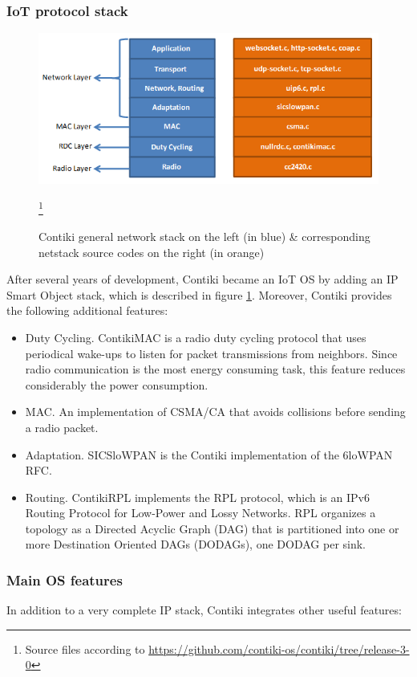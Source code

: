 \subsubsection{IoT protocol stack}
\begin{figure}[htb]
	\centering
	\includegraphics[width=1\columnwidth]{chapters/background.images/Contikinetstack.png}
	\caption{Contiki general network stack on the left (in blue) \& corresponding  netstack source codes on the right (in orange)}\footnote{Source files according to \url{https://github.com/contiki-os/contiki/tree/release-3-0}}
	\label{fig:ContikiNetStack}
\end{figure}
After several years of development, Contiki became an IoT OS by adding an IP Smart Object stack, which is described in figure \ref{fig:ContikiNetStack}.
Moreover, Contiki provides the following additional features:
\begin{itemize}
	\item Duty Cycling. ContikiMAC\cite{dunkels2011contikimac} is a radio duty cycling protocol that uses periodical wake-ups to listen for packet transmissions from neighbors.
	Since radio communication is the most energy consuming task, this feature reduces considerably the power consumption.
	\item MAC. An implementation of CSMA/CA that avoids collisions before sending a radio packet.
	\item Adaptation. SICSloWPAN is the Contiki implementation of the 6loWPAN RFC\cite{rfc4944}.
	\item Routing. ContikiRPL\cite{tsiftes2010contikirpl} implements the RPL\cite{rfc6550} protocol, which is an IPv6 Routing Protocol for Low-Power and Lossy Networks. RPL organizes a	topology as a Directed Acyclic Graph (DAG) that is partitioned into one or more Destination Oriented DAGs (DODAGs), one DODAG per sink.
\end{itemize}

\subsubsection{Main OS features}
In addition to a very complete IP stack, Contiki integrates other useful features:

